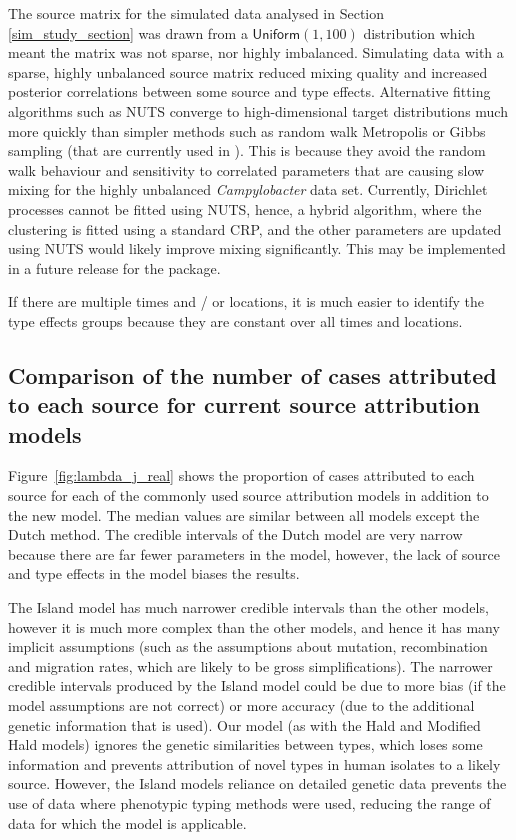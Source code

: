 The source matrix for the simulated data analysed in Section \ref{sim_study_section} was drawn from a $\textsf{Uniform}(1, 100)$ distribution which meant the matrix was not sparse, nor highly 
imbalanced. Simulating data with a sparse, highly unbalanced source matrix reduced mixing quality and increased posterior correlations between some source and type effects. Alternative fitting 
algorithms such as NUTS \citep{HomGel14} converge to high-dimensional target distributions much more quickly than simpler methods such as random walk Metropolis or Gibbs sampling (that are 
currently used in ). This is because they avoid the random walk behaviour and sensitivity to correlated parameters that are causing slow mixing for the highly unbalanced 
\emph{Campylobacter} data set. Currently, Dirichlet processes cannot be fitted using NUTS, hence, a hybrid algorithm, where the clustering is fitted using a standard CRP, and the other parameters 
are updated using NUTS would likely improve mixing significantly. This may be implemented in a future release for the  package.

If there are multiple times and / or locations, it is much easier to identify the type effects groups 
because they are constant over all times and locations.

\subsection{Comparison of the number of cases attributed to each source for current source attribution models} %
Figure~\ref{fig:lambda_j_real} shows the proportion of cases attributed to each source for each of the commonly used source attribution models in addition to the new model. The median values are 
similar between all models except the Dutch method. The credible intervals of the Dutch model are very narrow because there are far fewer parameters in the model, however, the lack of source and 
type effects in the model biases the results. 

The Island model has much narrower credible intervals than the other models, however it is much more complex than the other models, and hence it has many implicit assumptions (such as the 
assumptions about mutation, recombination and migration rates, which are likely to be gross simplifications). The narrower credible intervals produced by the Island model could be due to more bias 
(if the model assumptions are not correct) or more accuracy (due to the additional genetic information that is used).  Our model (as with the Hald and Modified Hald models) ignores the genetic similarities between types, which loses some information and prevents attribution of novel types in human isolates to a 
likely source. However, the Island models reliance on detailed genetic data prevents the use of data where phenotypic typing methods were used, reducing the range of data for which the model is 
applicable. 

